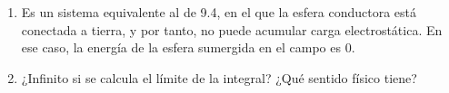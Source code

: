 \begin{enumerate}
    \vspace{20px}

    \item Es un sistema equivalente al de 9.4, en el que la esfera conductora está conectada a tierra, y por tanto, no puede acumular carga electrostática.
    En ese caso, la energía de la esfera sumergida en el campo es 0.

    \vspace{20px}

    \item ¿Infinito si se calcula el límite de la integral? ¿Qué sentido físico tiene?

\end{enumerate}